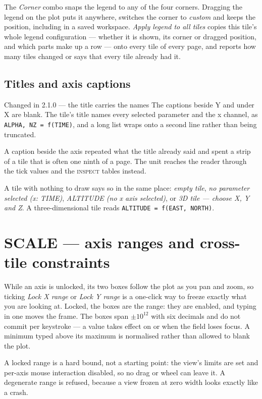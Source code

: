 \documentclass[11pt,a4paper,oneside]{report}
\newcommand{\code}[1]{\texttt{#1}}
\newcommand{\key}[1]{\textsf{\small\fbox{#1}}}
\newcommand{\tab}[1]{\textsc{#1}}
\begin{document}
The \emph{Corner} combo snaps the legend to any of the four corners. Dragging the
legend on the plot puts it anywhere, switches the corner to \emph{custom} and
keeps the position, including in a saved workspace. \emph{Apply legend to all
tiles} copies this tile's whole legend configuration --- whether it is shown, its
corner or dragged position, and which parts make up a row --- onto every tile of
every page, and reports how many tiles changed or says that every tile already
had it.

\subsection{Titles and axis captions}

\begin{aoenew}{Changed in 2.1.0 --- the title carries the names}
The captions beside Y and under X are blank. The tile's title names every
selected parameter and the x channel, as \code{ALPHA, NZ = f(TIME)}, and a long
list wraps onto a second line rather than being truncated.

A caption beside the axis repeated what the title already said and spent a strip
of a tile that is often one ninth of a page. The unit reaches the reader through
the tick values and the \tab{inspect} tables instead.
\end{aoenew}

A tile with nothing to draw says so in the same place: \emph{empty tile},
\emph{no parameter selected (x: TIME)}, \emph{ALTITUDE (no x axis selected)}, or
\emph{3D tile --- choose X, Y and Z}. A three-dimensional tile reads
\code{ALTITUDE = f(EAST, NORTH)}.

\section{SCALE --- axis ranges and cross-tile constraints}

While an axis is unlocked, its two boxes follow the plot as you pan and zoom, so
ticking \emph{Lock X range} or \emph{Lock Y range} is a one-click way to freeze
exactly what you are looking at. Locked, the boxes are the range: they are
enabled, and typing in one moves the frame. The boxes span $\pm 10^{12}$ with six
decimals and do not commit per keystroke --- a value takes effect on
\key{Enter} or when the field loses focus. A minimum typed above its maximum is
normalised rather than allowed to blank the plot.

A locked range is a hard bound, not a starting point: the view's limits are set
and per-axis mouse interaction disabled, so no drag or wheel can leave it. A
degenerate range is refused, because a view frozen at zero width looks exactly
like a crash.
\end{document}
